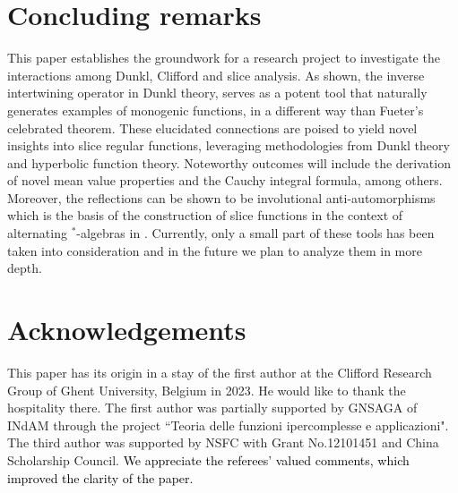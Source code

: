 \documentclass{amsart}
\theoremstyle{definition}
\theoremstyle{remark}
\numberwithin{equation}{section}
\begin{document}
  \section{Concluding remarks}
This paper establishes the groundwork for a research project to investigate the interactions among Dunkl, Clifford and slice analysis. As shown, the inverse intertwining operator in Dunkl theory, serves as a potent tool that naturally generates examples of monogenic functions, in a different way than Fueter's celebrated theorem. These elucidated connections are poised to yield novel insights into slice regular functions, leveraging methodologies  from Dunkl theory and hyperbolic function theory. Noteworthy outcomes will include the derivation of novel mean value properties and the Cauchy integral formula, among others.  Moreover, the reflections can be shown to be involutional anti-automorphisms which is the basis of the construction of slice functions in the context of alternating $^\ast$-algebras in \cite{ghiper}. Currently, only a small part of these tools has been taken into consideration and in the future we plan to analyze them in more depth.

   \section*{Acknowledgements} This paper has its origin in a stay of the first  author at the Clifford Research Group of Ghent University, Belgium in 2023. He would like to thank the hospitality there. The first author was  partially supported by GNSAGA of INdAM through the project ``Teoria delle funzioni ipercomplesse e applicazioni". The third author was supported  by NSFC with Grant No.12101451 and  China Scholarship Council. \textcolor{black}{We appreciate the referees'  valued comments,  which improved the clarity of the paper.}

\end{document}
